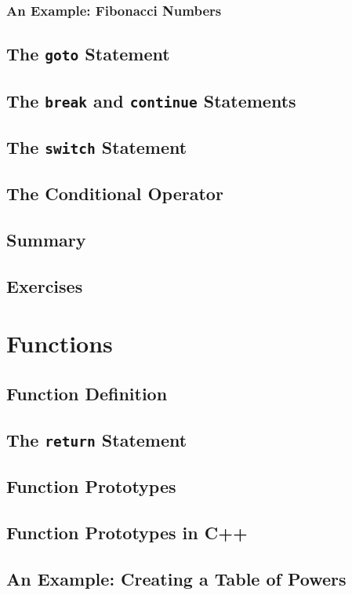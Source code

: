 \documentclass{article}
\begin{document}
\subsection{An Example: Fibonacci Numbers}
\section{The \texttt{goto} Statement}
\section{The \texttt{break} and \texttt{continue} Statements}
\section{The \texttt{switch} Statement}
\section{The Conditional Operator}
\section{Summary}
\section{Exercises}

\chapter{Functions}

\section{Function Definition}
\section{The \texttt{return} Statement}
\section{Function Prototypes}
\section{Function Prototypes in C++}
\section{An Example: Creating a Table of Powers}
\end{document}

